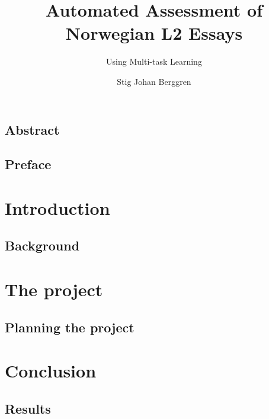 \documentclass[UKenglish]{ifimaster}
\title{Automated Assessment of Norwegian L2 Essays}
\subtitle{Using Multi-task Learning}
\author{Stig Johan Berggren}
\begin{document}
\duoforside[
  dept={Department of Informatics},
  program={Language and Communication},
  short
]

\frontmatter{}
\chapter*{Abstract}

\tableofcontents{}
\listoffigures{}
\listoftables{}

\chapter*{Preface}                    %

\mainmatter{}
\part{Introduction}                   %

\chapter{Background}                  %



\part{The project}                    %

\chapter{Planning the project}        %


\part{Conclusion}                     %

\chapter{Results}                     %


\backmatter{}

\printbibliography
\end{document}
